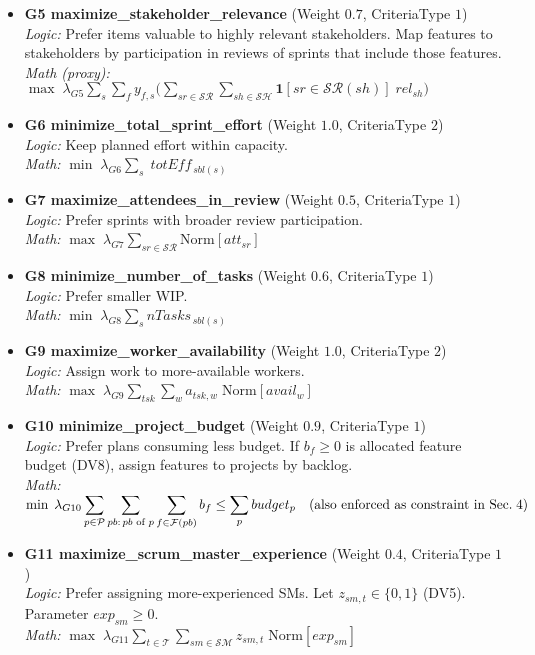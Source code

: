 \documentclass[11pt,a4paper]{article}
\begin{document}
\begin{itemize}[leftmargin=2em]
  \item \textbf{G5 \; maximize\_stakeholder\_relevance} (Weight $0.7$, CriteriaType $1$)\\
  \emph{Logic:} Prefer items valuable to highly relevant stakeholders. Map features to stakeholders by participation in reviews of sprints that include those features.\\
  \emph{Math (proxy):} $\displaystyle \max \; \lambda_{G5}\sum_{s}\sum_{f} y_{f,s}\Big(\sum_{sr\in\mathcal{S\!R}}\sum_{sh\in\mathcal{S\!H}} \mathbf{1}[sr\in \mathcal{S\!R}(sh)]\;rel_{sh}\Big)$

  \item \textbf{G6 \; minimize\_total\_sprint\_effort} (Weight $1.0$, CriteriaType $2$)\\
  \emph{Logic:} Keep planned effort within capacity.\\
  \emph{Math:} $\displaystyle \min \; \lambda_{G6}\sum_{s}\; totEff_{\,sbl(s)}$

  \item \textbf{G7 \; maximize\_attendees\_in\_review} (Weight $0.5$, CriteriaType $1$)\\
  \emph{Logic:} Prefer sprints with broader review participation.\\
  \emph{Math:} $\displaystyle \max \; \lambda_{G7}\sum_{sr\in\mathcal{S\!R}} \mathrm{Norm}[att_{sr}]$

  \item \textbf{G8 \; minimize\_number\_of\_tasks} (Weight $0.6$, CriteriaType $1$)\\
  \emph{Logic:} Prefer smaller WIP.\\
  \emph{Math:} $\displaystyle \min \; \lambda_{G8}\sum_{s} nTasks_{\,sbl(s)}$

  \item \textbf{G9 \; maximize\_worker\_availability} (Weight $1.0$, CriteriaType $2$)\\
  \emph{Logic:} Assign work to more-available workers.\\
  \emph{Math:} $\displaystyle \max \; \lambda_{G9}\sum_{tsk}\sum_{w} a_{tsk,w}\; \mathrm{Norm}[avail_w]$

  \item \textbf{G10 \; minimize\_project\_budget} (Weight $0.9$, CriteriaType $1$)\\
  \emph{Logic:} Prefer plans consuming less budget. If $b_f\ge 0$ is allocated feature budget (DV8), assign features to projects by backlog.\\
  \emph{Math:} $\displaystyle \min \; \lambda_{G10}\sum_{p\in\mathcal{P}} \sum_{pb:\,pb\text{ of }p}\sum_{f\in\mathcal{F}(pb)} b_f \le \sum_{p} budget_p\quad\text{(also enforced as constraint in Sec.\;4)}$

  \item \textbf{G11 \; maximize\_scrum\_master\_experience} (Weight $0.4$, CriteriaType $1$)\\
  \emph{Logic:} Prefer assigning more-experienced SMs. Let $z_{sm,t}\in\{0,1\}$ (DV5). Parameter $exp_{sm}\ge 0$.\\
  \emph{Math:} $\displaystyle \max \; \lambda_{G11}\sum_{t\in\mathcal{T}}\sum_{sm\in\mathcal{S\!M}} z_{sm,t}\;\mathrm{Norm}[exp_{sm}]$
\end{itemize}
\end{document}
